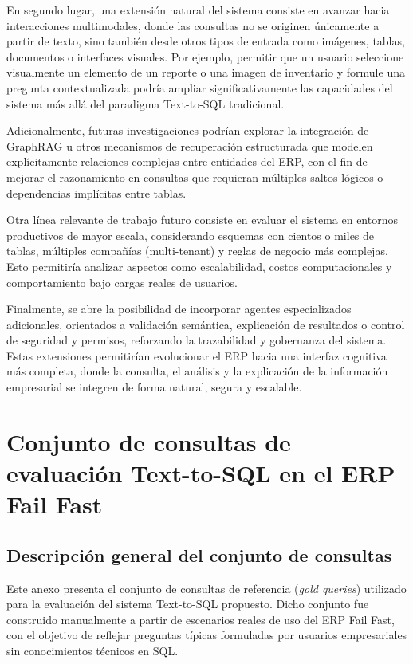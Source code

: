 \documentclass[journal]{IEEEtran}
\begin{document}
En segundo lugar, una extensión natural del sistema consiste en avanzar hacia interacciones multimodales, donde las consultas no se originen únicamente a partir de texto, sino también desde otros tipos de entrada como imágenes, tablas, documentos o interfaces visuales. Por ejemplo, permitir que un usuario seleccione visualmente un elemento de un reporte o una imagen de inventario y formule una pregunta contextualizada podría ampliar significativamente las capacidades del sistema más allá del paradigma Text-to-SQL tradicional.

Adicionalmente, futuras investigaciones podrían explorar la integración de GraphRAG \cite{han2025graphrag} u otros mecanismos de recuperación estructurada que modelen explícitamente relaciones complejas entre entidades del ERP, con el fin de mejorar el razonamiento en consultas que requieran múltiples saltos lógicos o dependencias implícitas entre tablas.

Otra línea relevante de trabajo futuro consiste en evaluar el sistema en entornos productivos de mayor escala, considerando esquemas con cientos o miles de tablas, múltiples compañías (multi-tenant) y reglas de negocio más complejas. Esto permitiría analizar aspectos como escalabilidad, costos computacionales y comportamiento bajo cargas reales de usuarios.

Finalmente, se abre la posibilidad de incorporar agentes especializados adicionales, orientados a validación semántica, explicación de resultados o control de seguridad y permisos, reforzando la trazabilidad y gobernanza del sistema. Estas extensiones permitirían evolucionar el ERP hacia una interfaz cognitiva más completa, donde la consulta, el análisis y la explicación de la información empresarial se integren de forma natural, segura y escalable.

\appendix

\section{Conjunto de consultas de evaluación Text-to-SQL en el ERP Fail Fast}

\subsection{Descripción general del conjunto de consultas}

Este anexo presenta el conjunto de consultas de referencia (\textit{gold queries}) utilizado para la evaluación del sistema Text-to-SQL propuesto. Dicho conjunto fue construido manualmente a partir de escenarios reales de uso del ERP Fail Fast, con el objetivo de reflejar preguntas típicas formuladas por usuarios empresariales sin conocimientos técnicos en SQL.
\end{document}
